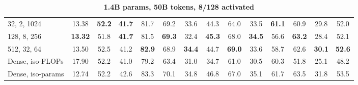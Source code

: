 \begin{table}[!htbp]
    \vspace{0.5em}
    \begin{subtable}[!ht]{\textwidth}
   \caption{\textbf{1.4B params, 50B tokens, 8/128 activated}}  \label{tab:moe-granularity:b}
    \begin{tabular*}{\textwidth}{@{\extracolsep{\fill}}l!{\vrule width 0.4pt}c!{\vrule width 0.4pt}ccccccccccc!{\vrule width 0.4pt}c}
    \toprule
    32, 2, 1024 & 13.38 & \textbf{52.2} & \textbf{41.7} & 81.7 & 69.2 & 33.6 & 44.3 & 64.0 & 33.5 & \textbf{61.1} & 60.9 & 29.8 &  52.0 \\
    128, 8, 256 & \textbf{13.32} & 51.8 & \textbf{41.7} & 81.5 & \textbf{69.3} & 32.4 & \textbf{45.3} & 68.0 & \textbf{34.5} & 56.6 & \textbf{63.2} & 28.4 & 52.1 \\
    512, 32, 64 &  13.50  & 52.5 & 41.2 & \textbf{82.9} & 68.9 & \textbf{34.4} & 44.7 & \textbf{69.0} & 33.6 & 58.7 & 62.6 & \textbf{30.1} & \textbf{52.6} \\ 
    \hline \hline



    Dense, iso-FLOPs &  17.90 & 52.2 & 41.0 & 79.2 & 63.4 & 31.0 & 34.7 & 61.0 & 30.5 & 60.3 & 51.8 & 25.1 & 48.2 \\

    Dense, iso-params & 12.74  & 52.2  & 42.6 & 83.3 & 70.1 & 34.8 & 46.8 & 67.0 & 35.1 & 61.7 & 63.5 & 31.8 & 53.5 \\

    \bottomrule
    \end{tabular*}
    \end{subtable}
\end{table}
\raggedbottom